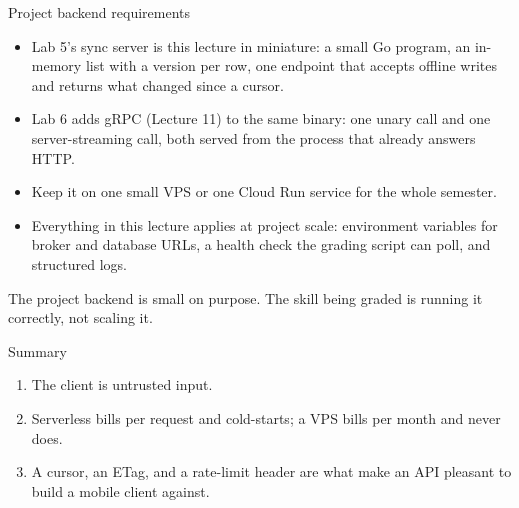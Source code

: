\documentclass[10pt,aspectratio=169,t]{beamer}
\begin{document}
\begin{frame}[eyebrow=Deploying]{Project backend requirements}
  \vskip 1mm
  \begin{itemize}
    \item Lab 5's sync server is this lecture in miniature: a small Go program, an in-memory list with a version per row, one endpoint that accepts offline writes and returns what changed since a cursor.
    \item Lab 6 adds gRPC (Lecture 11) to the same binary: one unary call and one server-streaming call, both served from the process that already answers HTTP.
    \item Keep it on one small VPS or one Cloud Run service for the whole semester.
    \item Everything in this lecture applies at project scale: environment variables for broker and database URLs, a health check the grading script can poll, and structured logs.
  \end{itemize}
  \begin{takeaway}{The project backend is small on purpose.}
    The skill being graded is running it correctly, not scaling it.
  \end{takeaway}
\end{frame}

\begin{frame}[eyebrow=Recap]{Summary}
  \vskip 2mm
  \begin{enumerate}
    \item The client is untrusted input. 
    \item Serverless bills per request and cold-starts; a VPS bills per month and never does. 
    \item A cursor, an ETag, and a rate-limit header are what make an API pleasant to build a mobile client against. 
  \end{enumerate}
  \vskip 5mm
\end{frame}

\end{document}
